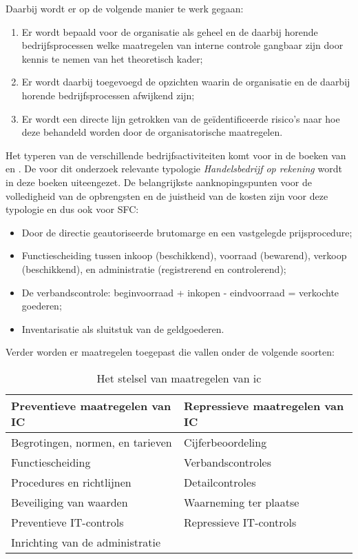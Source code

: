 \newpage
\noindent
Daarbij wordt er op de volgende manier te werk gegaan:

\begin{enumerate}
    \item Er wordt bepaald voor de organisatie als geheel en de daarbij horende bedrijfsprocessen welke maatregelen van interne controle gangbaar zijn door kennis te nemen van het theoretisch kader;
    \item Er wordt daarbij toegevoegd de opzichten waarin de organisatie en de daarbij horende bedrijfsprocessen afwijkend zijn;
    \item Er wordt een directe lijn getrokken van de geïdentificeerde risico's naar hoe deze behandeld worden door de organisatorische maatregelen.
\end{enumerate}

Het typeren van de verschillende bedrijfsactiviteiten komt voor in de boeken van \citet{bivperspectief} en \citet{bivpraktijk}. De voor dit onderzoek relevante typologie \emph{Handelsbedrijf op rekening} wordt in deze boeken uiteengezet. De belangrijkste aanknopingspunten voor de volledigheid van de opbrengsten en de juistheid van de kosten zijn voor deze typologie en dus ook voor SFC:

\begin{itemize}
    \item Door de directie geautoriseerde brutomarge en een vastgelegde prijsprocedure;
    \item Functiescheiding tussen inkoop (beschikkend), voorraad (bewarend), verkoop (beschikkend), en administratie (registrerend en controlerend);
    \item De verbandscontrole: beginvoorraad + inkopen - eindvoorraad = verkochte goederen;
    \item Inventarisatie als sluitstuk van de \gls{geldgoederen}.
\end{itemize}

\noindent
Verder worden er maatregelen toegepast die vallen onder de volgende soorten:
\begin{table}[h]
    \centering
    \caption{Het stelsel van maatregelen van \gls{ic} \citep{bivpraktijk}}
    \begin{tabular}{l l}
        \toprule
        \textbf{Preventieve maatregelen van IC} & \textbf{Repressieve maatregelen van IC} \\
        \midrule
        Begrotingen, normen, en tarieven & Cijferbeoordeling \\
        Functiescheiding & Verbandscontroles \\
        Procedures en richtlijnen & Detailcontroles \\
        Beveiliging van waarden & Waarneming ter plaatse \\
        Preventieve IT-controls & Repressieve IT-controls \\
        Inrichting van de administratie \\
        \bottomrule
    \end{tabular}
    \label{tab:icmaatregelen}
\end{table}


